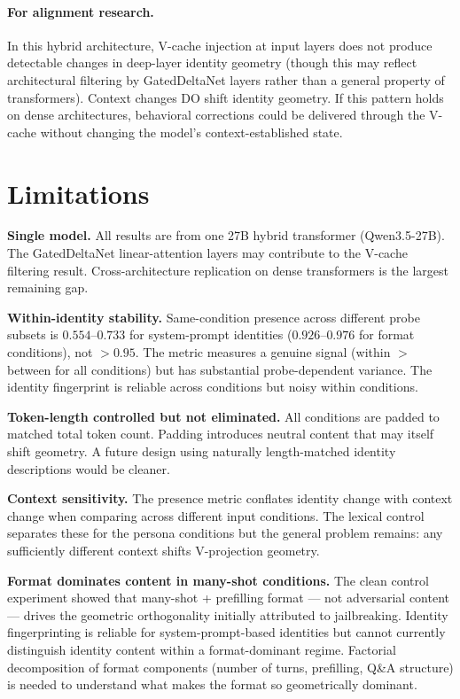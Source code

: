 \documentclass[11pt,a4paper]{article}
\begin{document}
\paragraph{For alignment research.}
In this hybrid architecture, V-cache injection at input layers does not
produce detectable changes in deep-layer identity geometry (though this
may reflect architectural filtering by GatedDeltaNet layers rather than
a general property of transformers). Context changes DO shift identity
geometry. If this pattern holds on dense architectures, behavioral
corrections could be delivered through the V-cache without changing the
model's context-established state.

\section{Limitations}
\label{sec:limitations}

\textbf{Single model.} All results are from one 27B hybrid transformer
(Qwen3.5-27B). The GatedDeltaNet linear-attention layers may contribute
to the V-cache filtering result. Cross-architecture replication on dense
transformers is the largest remaining gap.

\textbf{Within-identity stability.} Same-condition presence across
different probe subsets is $0.554$--$0.733$ for system-prompt identities ($0.926$--$0.976$ for format conditions), not $>0.95$. The metric
measures a genuine signal (within $>$ between for all conditions) but has
substantial probe-dependent variance. The identity fingerprint is
reliable across conditions but noisy within conditions.

\textbf{Token-length controlled but not eliminated.} All conditions are
padded to matched total token count. Padding introduces neutral content
that may itself shift geometry. A future design using naturally
length-matched identity descriptions would be cleaner.

\textbf{Context sensitivity.} The presence metric conflates identity
change with context change when comparing across different input
conditions. The lexical control separates these for the persona
conditions but the general problem remains: any sufficiently different
context shifts V-projection geometry.

\textbf{Format dominates content in many-shot conditions.} The clean
control experiment showed that many-shot + prefilling format --- not
adversarial content --- drives the geometric orthogonality initially
attributed to jailbreaking. Identity fingerprinting is reliable for
system-prompt-based identities but cannot currently distinguish
identity content within a format-dominant regime. Factorial
decomposition of format components (number of turns, prefilling,
Q\&A structure) is needed to understand what makes the format so
geometrically dominant.
\end{document}
